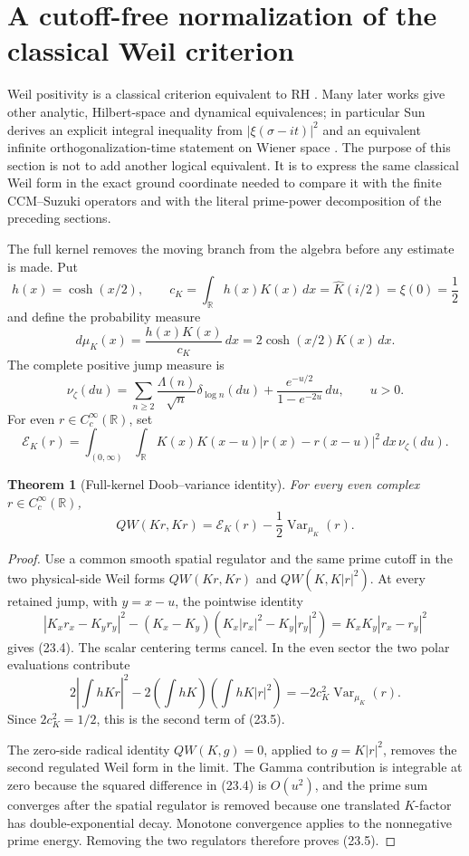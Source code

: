 \documentclass[11pt]{amsart}
\newtheorem{theorem}{Theorem}[section]
\theoremstyle{definition}
\theoremstyle{remark}
\begin{document}
\section{A cutoff-free normalization of the classical Weil criterion}
\label{sec:doob-variance}

Weil positivity is a classical criterion equivalent to RH
\cite{Weil1952}.  Many later works give other analytic, Hilbert-space and
dynamical equivalences; in particular Sun derives an explicit integral
inequality from \(|\xi(\sigma-it)|^2\) and an equivalent infinite
orthogonalization-time statement on Wiener space \cite{Sun}.  The purpose
of this section is not to add another logical equivalent.  It is to express
the same classical Weil form in the exact ground coordinate needed to
compare it with the finite CCM--Suzuki operators and with the literal
prime-power decomposition of the preceding sections.

The full kernel removes the moving branch from the algebra before any
estimate is made.  Put
\[
 h(x)=\cosh(x/2),\qquad
 c_K=\int_\mathbb R h(x)K(x)\,dx
     =\widehat K(i/2)=\xi(0)=\frac12
\tag{23.1}
\]
and define the probability measure
\[
 d\mu_K(x)=\frac{h(x)K(x)}{c_K}\,dx
          =2\cosh(x/2)K(x)\,dx.
\tag{23.2}
\]
The complete positive jump measure is
\[
 \nu_\zeta(du)
 =\sum_{n\ge2}\frac{\Lambda(n)}{\sqrt n}
       \delta_{\log n}(du)
  +\frac{e^{-u/2}}{1-e^{-2u}}\,du,
 \qquad u>0.
\tag{23.3}
\]
For even \(r\in C_c^\infty(\mathbb R)\), set
\[
 \mathscr E_K(r)
 =\int_{(0,\infty)}\!\int_\mathbb R
 K(x)K(x-u)|r(x)-r(x-u)|^2\,dx\,\nu_\zeta(du).
\tag{23.4}
\]

\begin{theorem}[Full-kernel Doob--variance identity]
\label{thm:doob-variance}
For every even complex \(r\in C_c^\infty(\mathbb R)\),
\[
 \boxed{
 QW(Kr,Kr)=\mathscr E_K(r)
 -\frac12\operatorname{Var}_{\mu_K}(r).}
\tag{23.5}
\]
\end{theorem}

\begin{proof}
Use a common smooth spatial regulator and the same prime cutoff in the two
physical-side Weil forms \(QW(Kr,Kr)\) and
\(QW(K,K|r|^2)\).  At every retained jump, with
\(y=x-u\), the pointwise identity
\[
 |K_xr_x-K_yr_y|^2
 -(K_x-K_y)(K_x|r_x|^2-K_y|r_y|^2)
 =K_xK_y|r_x-r_y|^2
\tag{23.6}
\]
gives (23.4).  The scalar centering terms cancel.  In the even sector the
two polar evaluations contribute
\[
 2\left|\int hKr\right|^2
 -2\left(\int hK\right)
    \left(\int hK|r|^2\right)
 =-2c_K^2\operatorname{Var}_{\mu_K}(r).
\tag{23.7}
\]
Since \(2c_K^2=1/2\), this is the second term of (23.5).

The zero-side radical identity \(QW(K,g)=0\), applied to
\(g=K|r|^2\), removes the second regulated Weil form in the limit.
The Gamma contribution is integrable at zero because the squared
difference in (23.4) is \(O(u^2)\), and the prime sum converges after the
spatial regulator is removed because one translated \(K\)-factor has
double-exponential decay.  Monotone convergence applies to the nonnegative
prime energy.  Removing the two regulators therefore proves (23.5).
\end{proof}
\end{document}
